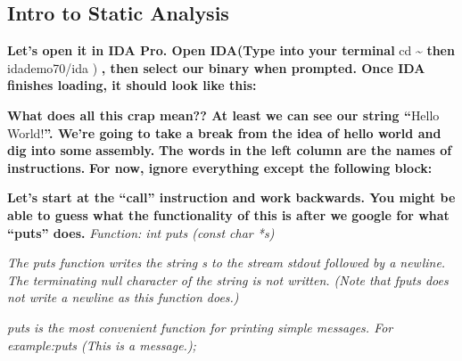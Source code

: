 \subsection{Intro to Static Analysis}

\textbf{Let's open it in IDA Pro. Open IDA(Type into your terminal }cd \~{} \textbf{then }idademo70/ida )\textbf{ , then
select our binary when prompted. \newline
Once IDA finishes loading, it should look like this: }

{\centering   
{}
 \par}
\textbf{What does all this crap mean?? At least we can see our string ``}Hello World!\textbf{{}''. \newline
We're going to take a break from the idea of hello world and dig into some
}\textbf{\textcolor[rgb]{0.07450981,0.30980393,0.36078432}{assembly.}}\textbf{ The words in the left column are the
names of }\textbf{\textcolor[rgb]{0.21960784,0.4627451,0.11372549}{instructions.}}\textbf{ For now, ignore everything
except the following block:}

{\centering
\textbf{\newline
\newline
 }  
 
\par}

\textbf{Let's start at the ``call'' instruction and work backwards. You might be able to guess what the functionality of
this is after we google for what ``puts'' does.\newline
\newline
}\textit{Function: int puts (const char *s)}

\textit{The puts function writes the string s to the stream stdout followed by a newline. The terminating null character
of the string is not written. (Note that fputs does not write a newline as this function does.)}

\textit{puts is the most convenient function for printing simple messages. \newline
For example:puts ({\textquotedbl}This is a message.{\textquotedbl});}

